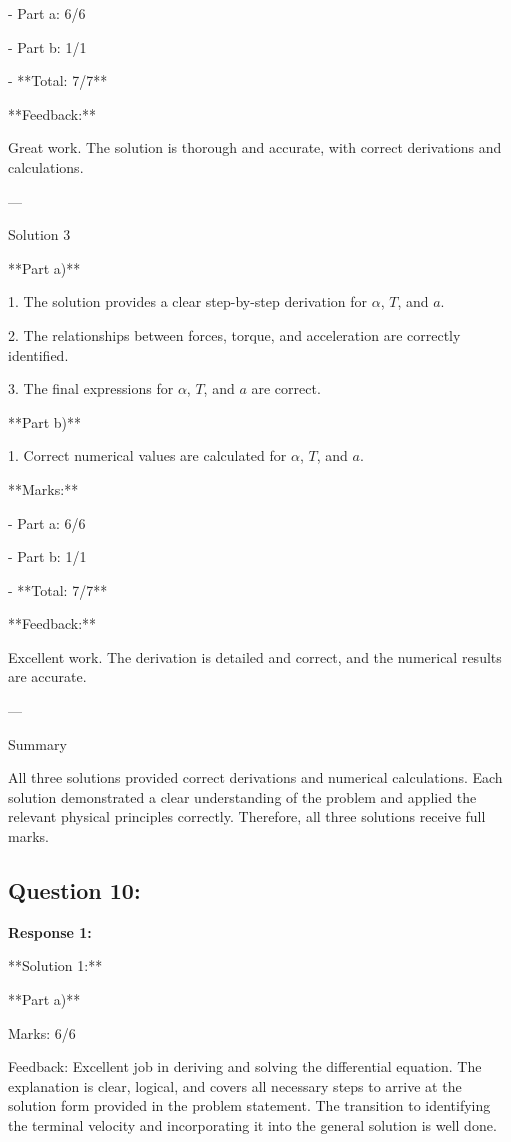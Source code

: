 \documentclass[a4paper,11pt]{article}
\begin{document}
- Part a: 6/6

- Part b: 1/1

- **Total: 7/7**

**Feedback:**

Great work. The solution is thorough and accurate, with correct derivations and calculations.

---

Solution 3

**Part a)**

1. The solution provides a clear step-by-step derivation for \(\alpha\), \(T\), and \(a\).

2. The relationships between forces, torque, and acceleration are correctly identified.

3. The final expressions for \(\alpha\), \(T\), and \(a\) are correct.

**Part b)**

1. Correct numerical values are calculated for \(\alpha\), \(T\), and \(a\).

**Marks:**

- Part a: 6/6

- Part b: 1/1

- **Total: 7/7**

**Feedback:**

Excellent work. The derivation is detailed and correct, and the numerical results are accurate.

---

Summary

All three solutions provided correct derivations and numerical calculations. Each solution demonstrated a clear understanding of the problem and applied the relevant physical principles correctly. Therefore, all three solutions receive full marks.

\subsection*{Question 10:}

\textbf{Response 1:}

**Solution 1:**

**Part a)**

Marks: 6/6

Feedback: Excellent job in deriving and solving the differential equation. The explanation is clear, logical, and covers all necessary steps to arrive at the solution form provided in the problem statement. The transition to identifying the terminal velocity and incorporating it into the general solution is well done.
\end{document}
